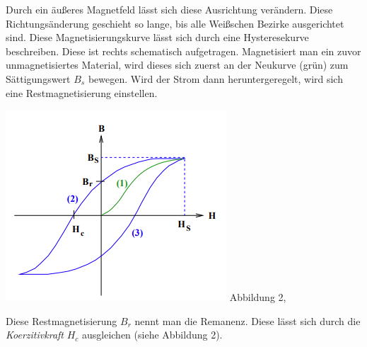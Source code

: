 \begin{minipage}{0.7\textwidth}
    Durch ein äußeres Magnetfeld lässt sich diese Ausrichtung verändern.
    Diese Richtungsänderung geschieht so lange, bis alle Weißschen Bezirke ausgerichtet sind.
    Diese Magnetisierungskurve lässt sich durch eine Hysteresekurve beschreiben.
    Diese ist rechts schematisch aufgetragen.
    Magnetisiert man ein zuvor unmagnetisiertes Material, wird dieses sich zuerst an der Neukurve (grün) zum Sättigungswert $B_{s}$ bewegen.
    Wird der Strom dann heruntergeregelt, wird sich eine Restmagnetisierung einstellen.
\end{minipage}
\begin{minipage}{0.3\textwidth}
    \includegraphics[width=\textwidth]{pictures/Hysteresekurve.png}
    \small{Abbildung 2, \cite{sample}}
\end{minipage}

Diese Restmagnetisierung $B_{r}$ nennt man die Remanenz.
Diese lässt sich durch die \textit{Koerzitivkraft} $H_{c}$ ausgleichen (siehe Abbildung 2).
